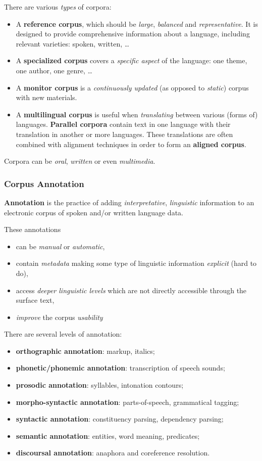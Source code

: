 There are various \emph{types} of corpora:
\begin{itemize}
	\item A \textbf{reference corpus}, which should be \emph{large}, \emph{balanced} and \emph{representative}.
	It is designed to provide comprehensive information about a language, including relevant varieties: spoken, written, \dots
	\item A \textbf{specialized corpus} covers a \emph{specific aspect} of the language: one theme, one author, one genre, \dots
	\item A \textbf{monitor corpus} is a \emph{continuously updated} (as opposed to \emph{static}) corpus with new materials.
	\item A \textbf{multilingual corpus} is useful when \emph{translating} between various (forms of) languages.
	\textbf{Parallel corpora} contain text in one language with their translation in another or more languages.
	These translations are often combined with alignment techniques in order to form an \textbf{aligned corpus}.
\end{itemize}
Corpora can be \emph{oral}, \emph{written} or even \emph{multimedia}.

\subsubsection{Corpus Annotation}
\begin{mydef}[Annotation]
	\textbf{Annotation} is the practice of adding \emph{interpretative}, \emph{linguistic} information to an electronic corpus of spoken and/or written language data.
\end{mydef}
These annotations
\begin{itemize}
	\item can be \emph{manual} or \emph{automatic},
	\item contain \emph{metadata} making some type of linguistic information \emph{explicit} (hard to do),
	\item access \emph{deeper linguistic levels} which are not directly accessible through the surface text,
	\item \emph{improve} the corpus \emph{usability}
\end{itemize}

There are several levels of annotation:
\begin{itemize}
	\item \textbf{orthographic annotation}: markup, italics;
	\item \textbf{phonetic/phonemic annotation}: transcription of speech sounds;
	\item \textbf{prosodic annotation}: syllables, intonation contours;
	\item \textbf{morpho-syntactic annotation}: parts-of-speech, grammatical tagging;
	\item \textbf{syntactic annotation}: constituency parsing, dependency parsing;
	\item \textbf{semantic annotation}: entities, word meaning, predicates;
	\item \textbf{discoursal annotation}: anaphora and coreference resolution.
\end{itemize}

